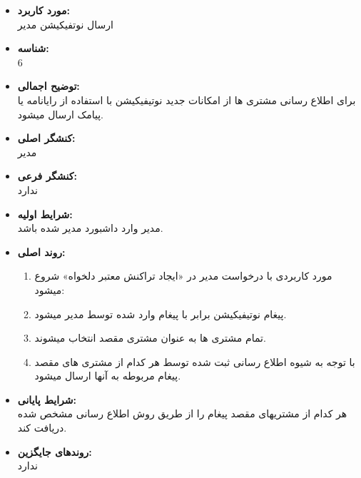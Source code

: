 \documentclass{article}
\begin{document}
\begin{itemize}
\item \textbf{مورد کاربرد:}\\
ارسال نوتفیکیشن مدیر
\item \textbf{شناسه:}\\
6
\item \textbf{توضیح اجمالی:}\\
برای اطلاع رسانی مشتری ها از امکانات جدید نوتیفیکیشن با استفاده از رایانامه یا پیامک ارسال میشود.
\item \textbf{کنشگر اصلی:}\\
مدیر
\item \textbf{کنشگر فرعی:}\\
ندارد
\item \textbf{شرایط اولیه:}\\
مدیر وارد داشبورد مدیر شده باشد.
\item \textbf{روند اصلی:}\\
\begin{enumerate}
\item مورد کاربردی با درخواست مدیر در «ایجاد تراکنش معتبر دلخواه» شروع میشود: 
\item پیغام نوتیفیکیشن برابر با پیغام وارد شده توسط مدیر میشود.
\item تمام مشتری ها به عنوان مشتری مقصد انتخاب میشوند.
\item با توجه به شیوه اطلاع رسانی ثبت شده توسط هر کدام از مشتری های مقصد پیغام مربوطه به آنها ارسال میشود.
\end{enumerate}

\item \textbf{شرایط پایانی:}\\ 
هر کدام از مشتریهای مقصد پیغام را از طریق روش اطلاع رسانی مشخص شده دریافت کند.
\item \textbf{روندهای جایگزین:}\\
ندارد
\end{itemize}
\noindent\makebox[\linewidth]{\rule{\paperwidth}{0.4pt}}
\end{document}
